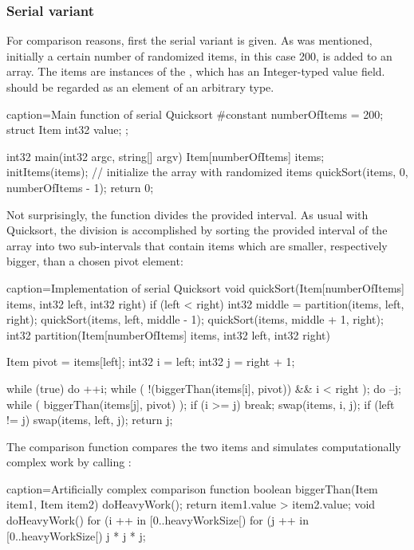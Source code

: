 \subsubsection{Serial variant}
For comparison reasons, first the serial variant is given. As was mentioned, initially a certain number of randomized items, in this case 200, is added to an array. The items are instances of the , which has an Integer-typed value field.  should be regarded as an element of an arbitrary type.
\begin{ccode}{caption=Main function of serial Quicksort}
#constant numberOfItems = 200;
struct Item { int32 value; }; 

int32 main(int32 argc, string[] argv) { 
  Item[numberOfItems] items; 
  initItems(items);                        // initialize the array with randomized items
  quickSort(items, 0, numberOfItems - 1);
  return 0; 
}
\end{ccode}
Not surprisingly, the  function divides the provided interval. As usual with Quicksort, the division is accomplished by sorting the provided interval of the array into two sub-intervals that contain items which are smaller, respectively bigger, than a chosen pivot element:
\begin{ccode}{caption=Implementation of serial Quicksort}
void quickSort(Item[numberOfItems] items, int32 left, int32 right) { 
  if (left < right) { 
    int32 middle = partition(items, left, right); 
    quickSort(items, left, middle - 1); 
    quickSort(items, middle + 1, right); 
  }
}
int32 partition(Item[numberOfItems] items, int32 left, int32 right) { 
  Item pivot = items[left]; 
  int32 i = left; 
  int32 j = right + 1; 
   
  while (true) { 
    do { ++i; } while ( !(biggerThan(items[i], pivot)) && i < right ); 
    do { --j; } while ( biggerThan(items[j], pivot) ); 
    if (i >= j) { break; }
    swap(items, i, j); 
  }
  if (left != j) { swap(items, left, j); }
  return j; 
}
\end{ccode}
The comparison function  compares the two items and simulates computationally complex work by calling :
\begin{ccode}{caption=Artificially complex comparison function}
boolean biggerThan(Item item1, Item item2) { 
  doHeavyWork(); 
  return item1.value > item2.value; 
}
void doHeavyWork() { 
  for (i ++ in [0..heavyWorkSize[) { 
    for (j ++ in [0..heavyWorkSize[) { j * j * j; }
  } 
}
\end{ccode}

